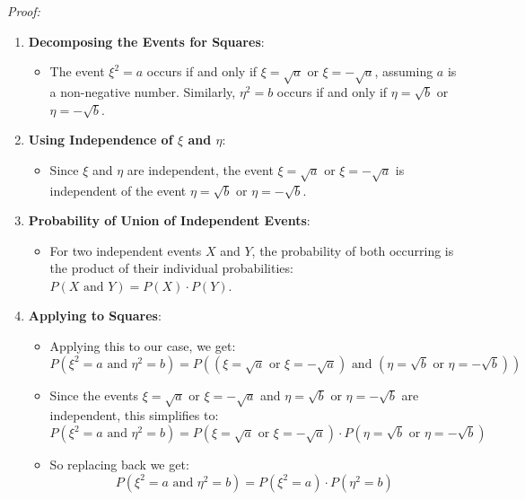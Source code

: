 \textit{Proof:}
\begin{enumerate}
    \item \textbf{Decomposing the Events for Squares}:
          \begin{itemize}
              \item The event \(\xi^2 = a\) occurs if and only if \(\xi = \sqrt{a}\) or \(\xi = -\sqrt{a}\), assuming \(a\) is a non-negative number. Similarly, \(\eta^2 = b\) occurs if and only if \(\eta = \sqrt{b}\) or \(\eta = -\sqrt{b}\).
          \end{itemize}
    \item \textbf{Using Independence of \(\xi\) and \(\eta\)}:
          \begin{itemize}
              \item Since \(\xi\) and \(\eta\) are independent, the event \(\xi = \sqrt{a}\) or \(\xi = -\sqrt{a}\) is independent of the event \(\eta = \sqrt{b}\) or \(\eta = -\sqrt{b}\).
          \end{itemize}
    \item \textbf{Probability of Union of Independent Events}:
          \begin{itemize}
              \item For two independent events \(X\) and \(Y\), the probability of both occurring is the product of their individual probabilities: \(P(X \text{ and } Y) = P(X) \cdot P(Y)\).
          \end{itemize}
    \item \textbf{Applying to Squares}:
          \begin{itemize}
              \item Applying this to our case, we get:
                    \[ P(\xi^2 = a \text{ and } \eta^2 = b) = P((\xi = \sqrt{a} \text{ or } \xi = -\sqrt{a}) \text{ and } (\eta = \sqrt{b} \text{ or } \eta = -\sqrt{b})) \]
              \item Since the events \(\xi = \sqrt{a}\) or \(\xi = -\sqrt{a}\) and \(\eta = \sqrt{b}\) or \(\eta = -\sqrt{b}\) are independent, this simplifies to:
                    \[ P(\xi^2 = a \text{ and } \eta^2 = b) = P(\xi = \sqrt{a} \text{ or } \xi = -\sqrt{a}) \cdot P(\eta = \sqrt{b} \text{ or } \eta = -\sqrt{b}) \]
              \item So replacing back we get:
                    \[ P(\xi^2 = a \text{ and } \eta^2 = b) = P(\xi^2 = a) \cdot P(\eta^2 = b) \]
          \end{itemize}
\end{enumerate}

